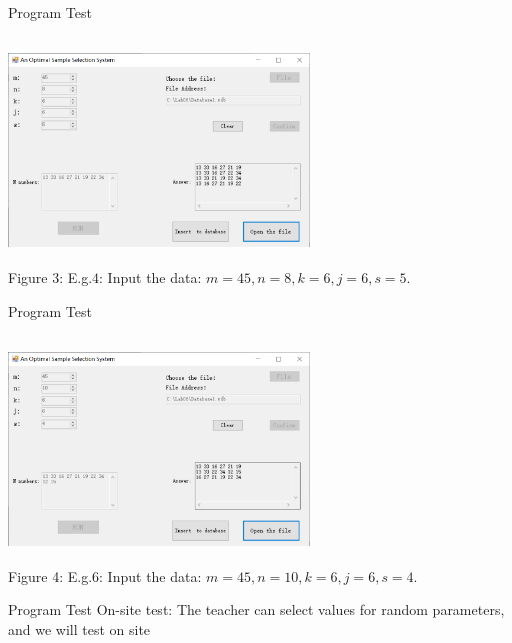 \documentclass[hyperref={pdfpagelabels=false}]{beamer}
\begin{document}
\begin{frame}{Program Test}
\begin{center}
    \includegraphics[width=8cm,height=6cm]{Figures/f4.png}\\
    Figure 3: E.g.$4$: Input the data: $m=45, n=8, k=6, j=6, s=5.$
\end{center}    
\end{frame}

\begin{frame}{Program Test}
\begin{center}
    \includegraphics[width=8cm,height=6cm]{Figures/f6.png}\\
    Figure 4: E.g.$6$: Input the data: $m=45, n=10, k=6, j=6, s=4.$
\end{center}    
\end{frame}

\begin{frame}{Program Test}
    On-site test: The teacher can select values for random parameters, and we will test on site
\end{frame}
\end{document}
